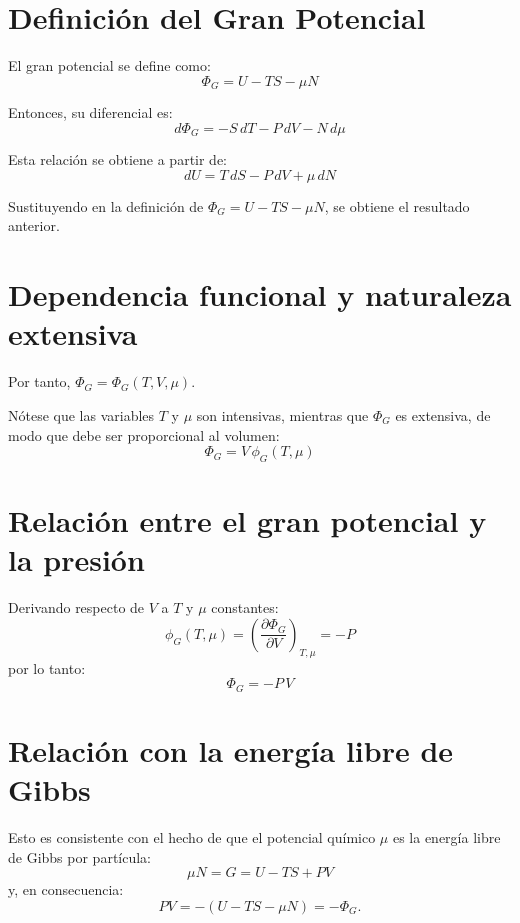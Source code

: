 


\section{Definición del Gran Potencial}

El gran potencial se define como:
\begin{equation}
\Phi_G = U - TS - \mu N \tag{4.1}
\end{equation}

Entonces, su diferencial es:
\begin{equation}
d\Phi_G = -S\,dT - P\,dV - N\,d\mu \tag{4.2}
\end{equation}

Esta relación se obtiene a partir de:
\begin{equation}
dU = T\,dS - P\,dV + \mu\,dN \tag{4.3}
\end{equation}

Sustituyendo en la definición de $\Phi_G = U - TS - \mu N$, se obtiene el resultado anterior.

\section{Dependencia funcional y naturaleza extensiva}

Por tanto, $\Phi_G = \Phi_G(T, V, \mu)$.

Nótese que las variables $T$ y $\mu$ son intensivas, mientras que $\Phi_G$ es extensiva, de modo que debe ser proporcional al volumen:
\begin{equation}
\Phi_G = V\,\phi_G(T, \mu) \tag{4.4}
\end{equation}

\section{Relación entre el gran potencial y la presión}

Derivando respecto de $V$ a $T$ y $\mu$ constantes:
\begin{equation}
\phi_G(T, \mu) = \left( \frac{\partial \Phi_G}{\partial V} \right)_{T, \mu} = -P \tag{4.5}
\end{equation}
por lo tanto:
\begin{equation}
\Phi_G = -P\,V \tag{4.6}
\end{equation}

\section{Relación con la energía libre de Gibbs}

Esto es consistente con el hecho de que el potencial químico $\mu$ es la energía libre de Gibbs por partícula:
\begin{equation}
\mu N = G = U - TS + PV \tag{4.7}
\end{equation}
y, en consecuencia:
\begin{equation}
PV = - (U - TS - \mu N) = -\Phi_G.
\end{equation}
